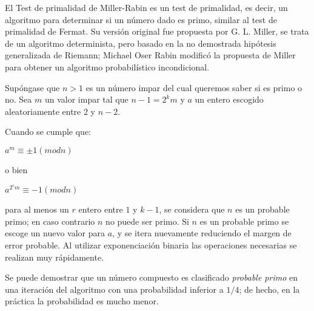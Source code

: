 El Test de primalidad de Miller-Rabin es un test de primalidad, es decir, un algoritmo para determinar si un número dado es primo, similar al test de primalidad de Fermat. Su versión original fue propuesta por G. L. Miller, se trata de un algoritmo determinista, pero basado en la no demostrada hipótesis generalizada de Riemann; Michael Oser Rabin modificó la propuesta de Miller para obtener un algoritmo probabilístico incondicional.

Supóngase que  $n > 1$ es un número impar del cual queremos saber si es primo o no. Sea $m$ un valor impar tal que $n-1 = 2^{k}m$ y $a$ un entero escogido aleatoriamente entre $2$ y $n-2$.

Cuando se cumple que:


$ a^{m} \equiv \pm 1 (mod n) $

o bien

$ a^{2^{r}m} \equiv - 1 (mod n)  $

para al menos un $r$ entero entre $1$ y $k-1$, se considera que $n$ es un probable primo; en caso contrario $n$ no puede ser primo. Si $n$ es un probable primo se escoge un nuevo valor para $a$, y se itera nuevamente reduciendo el margen de error probable. Al utilizar exponenciación binaria las operaciones necesarias se realizan muy rápidamente.

Se puede demostrar que un número compuesto es clasificado \emph{probable primo} en una iteración del algoritmo con una probabilidad inferior a $1/4$; de hecho, en la práctica la probabilidad es mucho menor.